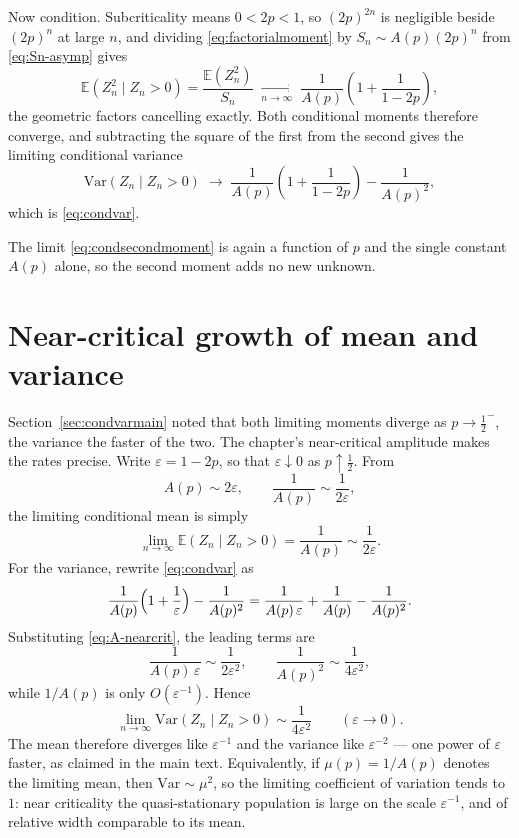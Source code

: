 \documentclass[11pt]{article}
\begin{document}
Now condition. Subcriticality means $0<2p<1$, so $(2p)^{2n}$ is negligible beside $(2p)^n$ at large $n$, and dividing \eqref{eq:factorialmoment} by $S_n\sim A(p)(2p)^n$ from \eqref{eq:Sn-asymp} gives
\begin{equation}
\label{eq:condsecondmoment}
\mathbb{E}(Z_n^2\mid Z_n>0)
= \frac{\mathbb{E}(Z_n^2)}{S_n}
\;\xrightarrow[n\to\infty]{}\;
\frac{1}{A(p)}\left(1+\frac{1}{1-2p}\right),
\end{equation}
the geometric factors cancelling exactly. Both conditional moments therefore converge, and subtracting the square of the first from the second gives the limiting conditional variance
\begin{equation}
\label{eq:condvar-app}
\mathrm{Var}(Z_n\mid Z_n>0)
\;\longrightarrow\;
\frac{1}{A(p)}\left(1+\frac{1}{1-2p}\right) - \frac{1}{A(p)^2},
\end{equation}
which is \eqref{eq:condvar}.

The limit \eqref{eq:condsecondmoment} is again a function of $p$ and the single constant $A(p)$ alone, so the second moment adds no new unknown.

\section{Near-critical growth of mean and variance}
\label{app:nearcritmoments}

Section~\ref{sec:condvarmain} noted that both limiting moments diverge as
$p\to\tfrac12^-$, the variance the faster of the two. The chapter's near-critical
amplitude makes the rates precise. Write $\varepsilon=1-2p$, so that
$\varepsilon\downarrow0$ as $p\uparrow\tfrac12$. From
\begin{equation}
\label{eq:A-nearcrit}
A(p)\sim 2\varepsilon,
\qquad
\frac1{A(p)}\sim\frac1{2\varepsilon},
\end{equation}
the limiting conditional mean is simply
\begin{equation}
\label{eq:mean-nearcrit}
\lim_{n\to\infty}\mathbb{E}(Z_n\mid Z_n>0)
= \frac1{A(p)}
\sim \frac1{2\varepsilon}.
\end{equation}
For the variance, rewrite \eqref{eq:condvar} as
\[
\frac1{A(p)}\Bigl(1+\frac1\varepsilon\Bigr)
- \frac1{A(p)^2}
= \frac1{A(p)\,\varepsilon}
+ \frac1{A(p)}
- \frac1{A(p)^2}.
\]
Substituting \eqref{eq:A-nearcrit}, the leading terms are
\[
\frac1{A(p)\,\varepsilon}
\sim \frac1{2\varepsilon^2},
\qquad
\frac1{A(p)^2}
\sim \frac1{4\varepsilon^2},
\]
while $1/A(p)$ is only $O(\varepsilon^{-1})$. Hence
\begin{equation}
\label{eq:var-nearcrit}
\lim_{n\to\infty}\mathrm{Var}(Z_n\mid Z_n>0)
\sim \frac1{4\varepsilon^2}
\qquad(\varepsilon\to0).
\end{equation}
The mean therefore diverges like $\varepsilon^{-1}$ and the variance like
$\varepsilon^{-2}$ --- one power of $\varepsilon$ faster, as claimed in the main
text. Equivalently, if $\mu(p)=1/A(p)$ denotes the limiting mean, then
$\mathrm{Var}\sim\mu^2$, so the limiting coefficient of variation tends to~$1$:
near criticality the quasi-stationary population is large on the scale
$\varepsilon^{-1}$, and of relative width comparable to its mean.
\end{document}
